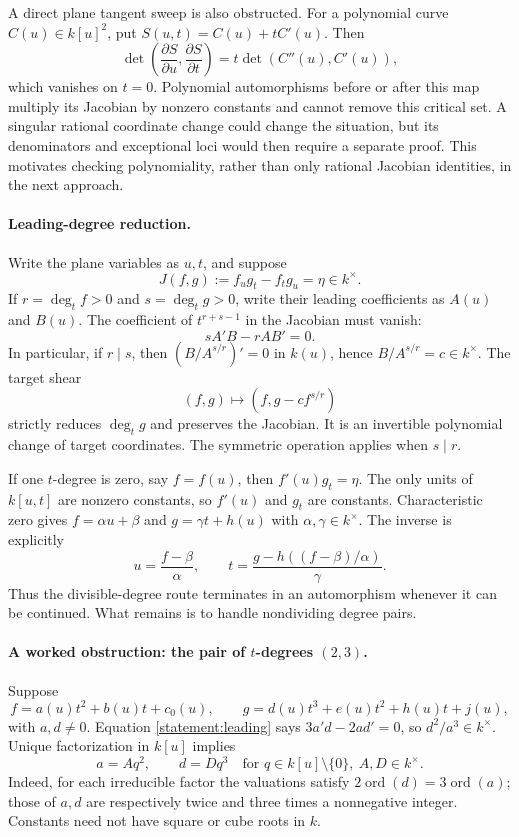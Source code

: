 \documentclass[11pt]{article}
\begin{document}
A direct plane tangent sweep is also obstructed. For a polynomial curve
$C(u)\in k[u]^2$, put $S(u,t)=C(u)+tC'(u)$. Then
\[
 \det\left(\frac{\partial S}{\partial u},
           \frac{\partial S}{\partial t}\right)
     =t\det(C''(u),C'(u)),
\]
which vanishes on $t=0$. Polynomial automorphisms before or after this map
multiply its Jacobian by nonzero constants and cannot remove this critical
set. A singular rational coordinate change could change the situation, but
its denominators and exceptional loci would then require a separate proof.
This motivates checking polynomiality, rather than only rational Jacobian
identities, in the next approach.

\paragraph{Leading-degree reduction.}
Write the plane variables as $u,t$, and suppose
\[
 J(f,g):=f_u g_t-f_t g_u=\eta\in k^\times.
\]
If $r=\deg_t f>0$ and $s=\deg_t g>0$, write their leading coefficients as
$A(u)$ and $B(u)$. The coefficient of $t^{r+s-1}$ in the Jacobian must vanish:
\begin{equation}\label{statement:leading}
 sA'B-rAB'=0.
\end{equation}
In particular, if $r\mid s$, then
$(B/A^{s/r})'=0$ in $k(u)$, hence $B/A^{s/r}=c\in k^\times$.
The target shear
\begin{equation}\label{statement:shear}
 (f,g)\longmapsto(f,g-cf^{s/r})
\end{equation}
strictly reduces $\deg_t g$ and preserves the Jacobian. It is an invertible
polynomial change of target coordinates. The symmetric operation applies
when $s\mid r$.

If one $t$-degree is zero, say $f=f(u)$, then $f'(u)g_t=\eta$. The only
units of $k[u,t]$ are nonzero constants, so $f'(u)$ and $g_t$ are constants.
Characteristic zero gives
$f=\alpha u+\beta$ and $g=\gamma t+h(u)$ with
$\alpha,\gamma\in k^\times$. The inverse is explicitly
\[
 u=\frac{f-\beta}{\alpha},\qquad
 t=\frac{g-h((f-\beta)/\alpha)}{\gamma}.
\]
Thus the divisible-degree route terminates in an automorphism whenever it
can be continued. What remains is to handle nondividing degree pairs.

\paragraph{A worked obstruction: the pair of $t$-degrees $(2,3)$.}
Suppose
\[
 f=a(u)t^2+b(u)t+c_0(u),\qquad
 g=d(u)t^3+e(u)t^2+h(u)t+j(u),
\]
with $a,d\ne0$. Equation \eqref{statement:leading} says $3a'd-2ad'=0$,
so $d^2/a^3\in k^\times$. Unique factorization in $k[u]$ implies
\[
 a=Aq^2,\qquad d=Dq^3
 \quad\text{for }q\in k[u]\setminus\{0\},\ A,D\in k^\times.
\]
Indeed, for each irreducible factor the valuations satisfy
$2\operatorname{ord}(d)=3\operatorname{ord}(a)$; those of $a,d$ are
respectively twice and three times a nonnegative integer. Constants need
not have square or cube roots in $k$.
\end{document}
